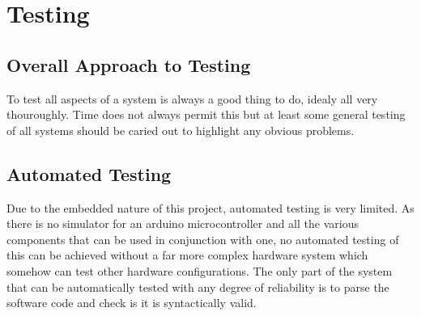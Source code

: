 \chapter{Testing}



\section{Overall Approach to Testing}
To test all aspects of a system is always a good thing to do, idealy all very thouroughly.  Time does not always permit this but at least some general testing of all systems should be caried out to highlight any obvious problems.
\section{Automated Testing}
Due to the embedded nature of this project, automated testing is very limited.  As there is no simulator for an arduino microcontroller and all the various components that can be used in conjunction with one, no automated testing of this can be achieved without a far more complex hardware system which somehow can test other hardware configurations.  The only part of the system that can be automatically tested with any degree of reliability is to parse the software code and check is it is syntactically valid.
